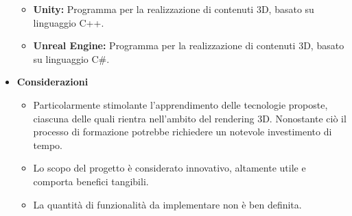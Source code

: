 \documentclass{article}
\begin{document}
\begin{itemize}
    \begin{itemize}
        \item \textbf{Unity:} Programma per la realizzazione di contenuti 3D, basato su linguaggio C++.
        \item \textbf{Unreal Engine:} Programma per la realizzazione di contenuti 3D, basato su linguaggio C\#.
    \end{itemize}
        
    \item[] \textbf{Considerazioni}
    \begin{itemize}
        \item Particolarmente stimolante l'apprendimento delle tecnologie proposte, ciascuna delle quali rientra nell'ambito del rendering 3D. Nonostante ciò il processo di formazione potrebbe richiedere un notevole investimento di tempo.
        \item Lo scopo del progetto è considerato innovativo, altamente utile e comporta benefici tangibili.
        \item La quantità di funzionalità da implementare non è ben definita.
    \end{itemize} 

\end{itemize}
\pagebreak

\end{document}
